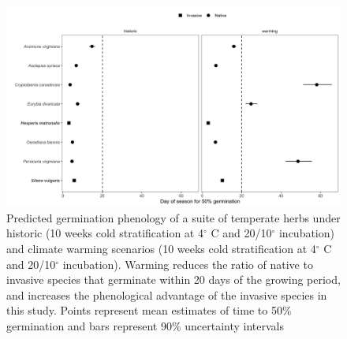 \documentclass{article}[11pt]
\begin{document}
\begin{figure}[h!]
    \centering
\includegraphics[width=\textwidth]{..//figure/commchange.jpeg}
   \caption{Predicted germination phenology of a suite of temperate herbs under historic (10 weeks cold stratification at 4$^{\circ}$ C and  20/10$^{\circ}$ incubation)  and climate warming scenarios (10 weeks cold stratification at 4$^{\circ}$ C and  20/10$^{\circ}$ incubation).  Warming reduces the ratio of native to invasive species that germinate within 20 days of the growing period, and increases the phenological advantage of the invasive species in this study. Points represent mean estimates of time to 50\% germination and bars represent 90\% uncertainty intervals } 
   \label{fig:comm}
\end{figure}




\end{document}
